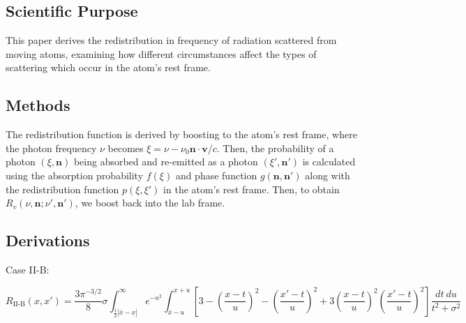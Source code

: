 \documentclass[onecolumn]{aastex63}
\begin{document}
\subsection{Scientific Purpose}

This paper derives the redistribution in frequency of radiation scattered from moving atoms, examining how different circumstances affect the types of scattering which occur in the atom's rest frame. 

\subsection{Methods}

The redistribution function is derived by boosting to the atom's rest frame, where the photon frequency $\nu$ becomes $\xi = \nu - \nu_0 \mathbf{n}\cdot \mathbf{v}/c$. Then, the probability of a photon $(\xi, \mathbf{n})$ being absorbed and re-emitted as a photon $(\xi', \mathbf{n}')$ is calculated using the absorption probability $f(\xi)$ and phase function $g(\mathbf{n}, \mathbf{n}')$ along with the redistribution function $p(\xi, \xi')$ in the atom's rest frame. Then, to obtain $R_v(\nu, \mathbf{n}; \nu', \mathbf{n}')$, we boost back into the lab frame.

\subsection{Derivations}

Case II-B:

\begin{equation}
    R_{\textrm{II-B}}(x, x') = \frac{3\pi^{-3/2}}{8}\sigma \int_{\frac{1}{2}|\bar{x} - \underset{\bar{}}{x}|}^{\infty} e^{-u^2}
    \int_{\bar{x}-u}^{\underset{\bar{}}{x}+u}\left[3 - \left(\frac{x-t}{u}\right)^2 - \left(\frac{x'-t}{u}\right)^2 + 3\left(\frac{x-t}{u}\right)^2\left(\frac{x'-t}{u}\right)^2\right]\frac{dt\ du}{t^2 + \sigma^2}
\end{equation}
\end{document}
